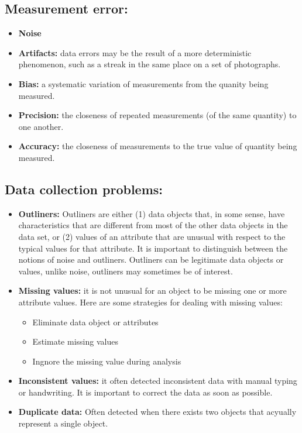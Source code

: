 	\subsection*{Measurement error:}
		\begin{itemize}
			\item {\bf Noise}
			\item {\bf Artifacts:} data errors may be the result of a more deterministic
			phenomenon, such as a streak in the same place on a set of photographs.
			\item {\bf Bias:} a systematic variation of measurements from the quanity
			being measured. 
			\item {\bf Precision:} the closeness of repeated measurements (of the
			same quantity) to one another.
			\item {\bf Accuracy:} the closeness of measurements to the true value
			of quantity being measured.
		\end{itemize}

	\subsection*{Data collection problems:}
		\begin{itemize}
			\item {\bf Outliners:} Outliners are either (1) data objects that, in some
			sense, have characteristics that are different from most of the other data
			objects in the data set, or (2) values of an attribute that are unusual with
			respect to the typical values for that attribute. It is important to distinguish
			between the notions of noise and outliners. Outliners can be legitimate data
			objects or values, unlike noise, outliners may sometimes be of interest. 
			\item {\bf Missing values:} it is not unusual for an object to be missing one 
			or more attribute values. Here are some strategies for dealing with missing values:
				\begin{itemize}
					\item Eliminate data object or attributes
					\item Estimate missing values
					\item Ingnore the missing value during analysis
				\end{itemize}
			\item {\bf Inconsistent values:} it often detected inconsistent data with manual
			typing or handwriting. It is important to correct the data as soon as possible.
			\item {\bf Duplicate data:} Often detected when there exists two objects that 
			acyually represent a single object. 
		\end{itemize}

